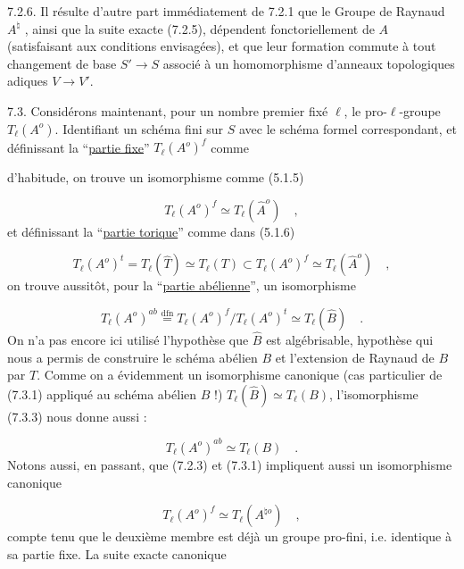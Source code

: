 7.2.6. Il résulte d'autre part immédiatement de 7.2.1 que le Groupe de Raynaud $A^{\natural}$ , ainsi que la suite exacte (7.2.5), dépendent fonctoriellement de $A$ (satisfaisant aux conditions envisagées), et que leur formation commute à tout changement de base $S' \longrightarrow S$ associé à un homomorphisme d'anneaux topologiques adiques $V \longrightarrow V'$.

7.3. Considérons maintenant, pour un nombre premier fixé $\ell$, le pro-$\ell$-groupe $T_{\ell}(A^{o})$. Identifiant un schéma fini sur $S$ avec le schéma formel correspondant, et définissant la ``\underline{partie fixe}'' $T_{\ell}(A^{o})^{f}$ comme



d'habitude, on trouve un isomorphisme comme (5.1.5)

\begin{equation}\tag{7.3.1}
T_{\ell}(A^{o})^{f} \simeq T_{\ell}(\hat{A}^{o}) \quad ,
\end{equation}
et définissant la ``\underline{partie torique}'' comme dans (5.1.6)

\begin{equation}\tag{7.3.2}
T_{\ell}(A^{o})^{t} = T_{\ell}(\hat{T}) \simeq T_{\ell}(T) \subset T_{\ell}(A^{o})^{f} \simeq T_{\ell}(\hat{A}^{o}) \quad ,
\end{equation}
on trouve aussitôt, pour la ``\underline{partie abélienne}'', un isomorphisme

\begin{equation}\tag{7.3.3}
T_{\ell}(A^{o})^{ab} \stackrel{\mathrm{dfn}}{=} T_{\ell}(A^{o})^{f}/T_{\ell}(A^{o})^{t} \simeq T_{\ell}(\hat{B}) \quad .
\end{equation}
On n'a pas encore ici utilisé l'hypothèse que $\hat{B}$ est algébrisable, hypothèse qui nous a permis de construire le schéma abélien $B$ et l'extension de Raynaud de $B$ par $T$. Comme on a évidemment un isomorphisme canonique (cas particulier de (7.3.1) appliqué au schéma abélien $B$ !) $T_{\ell}(\hat{B}) \simeq T_{\ell}(B)$, l'isomorphisme (7.3.3) nous donne aussi :

\begin{equation}\tag{7.3.4}
T_{\ell}(A^{o})^{ab} \simeq T_{\ell}(B) \quad .
\end{equation}
Notons aussi, en passant, que (7.2.3) et (7.3.1) impliquent aussi un isomorphisme canonique

\begin{equation}\tag{7.3.5}
T_{\ell}(A^{o})^{f} \simeq T_{\ell}(A^{\natural o}) \quad ,
\end{equation}
compte tenu que le deuxième membre est déjà un groupe pro-fini, i.e. identique à sa partie fixe. La suite exacte canonique

